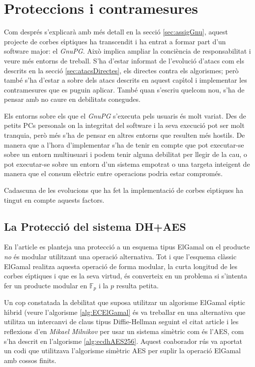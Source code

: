 \documentclass[12pt,twoside,catalan,a4paper]{book}%
\numberwithin{figure}{section}		%
\theoremstyle{definition}   			%
\def\ces{corbes e\lgem{}\'{\i}ptiques}%
\def\cfs{cossos finits}%
\newcommand{\Fp}{\ensuremath{\mathbb{F}_p}}%
\theoremstyle{saltolinea}   			%
\begin{document}
\section{Proteccions i contramesures}

Com despr\'es s'explicar\`a amb m\'es detall en la secci\'o \ref{sec:assigGnu}, aquest projecte de \ces{} ha transcendit i ha entrat a formar part d'un software major: el \emph{GnuPG}. Aix\`o implica ampliar la conci\`encia de responsabilitat i veure m\'es entorns de treball. S'ha d'estar informat de l'evoluci\'o d'atacs com els descrits en la secci\'o \ref{sec:atacsDirectes}, els directes contra els algorismes; per\`o tamb\'e s'ha d'estar a sobre dels atacs descrits en aquest cap\'{\i}tol i implementar les contramesures que es puguin aplicar. Tamb\'e quan s'escriu quelcom nou, s'ha de pensar amb no caure en debilitats conegudes.

Els entorns sobre els que el \emph{GnuPG} s'executa pels usuaris \'es molt variat. Des de petits PCs personals on la integritat del software i la seva execuci\'o pot ser molt tranqui\lgem{}a, per\`o m\'es s'ha de pensar en altres entorns que resulten m\'es hostils. De manera que a l'hora d'implementar s'ha de tenir en compte que pot executar-se sobre un entorn multiusuari i podem tenir alguna debilitat per llegir de la cau, o pot executar-se sobre un entorn d'un sistema empotrat o una targeta inte\lgem{}igent de manera que el consum el\`ectric entre operacions podria estar comprom\'es.

Cadascuna de les evolucions que ha fet la implementaci\'o de \ces{} ha tingut en compte aquests factors.

\subsection{La Protecci\'o del sistema DH+AES}\label{subsec:dhaes}

En l'article \cite{BJN} es planteja una protecci\'o a un esquema tipus ElGamal on el producte \emph{no} \'es modular utilitzant una operaci\'o alternativa. Tot i que l'esquema cl\`assic ElGamal realitza aquesta operaci\'o de forma modular, la curta longitud de les \ces{} i que es la seva virtud, \'es converteix en un problema si s'intenta fer un producte modular en \Fp{} i la $p$ resulta petita.

Un cop constatada la debilitat que suposa utilitzar un algorisme ElGamal e\lgem{}\'{\i}ptic h\'{\i}brid (veure l'algorisme \ref{alg:ECElGamal} \'es va treballar en una alternativa que utilitza un intercanvi de claus tipus Diffie-Hellman seguint el citat article i les reflexions d'en \emph{Mikael Milnikov} per usar un sistema sim\`etric com \'es l'AES, com s'ha descrit en l'algorisme \ref{alg:ecdhAES256}. Aquest co\lgem{}aborador r\'us va aportat un codi que utilitzava l'algorisme sim\`etric AES per suplir la operaci\'o ElGamal amb \cfs{}.
\end{document}
